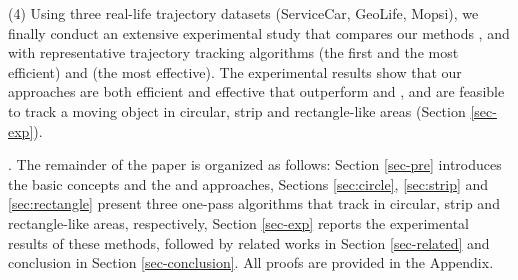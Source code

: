 \ni (4) Using three real-life trajectory datasets (ServiceCar, GeoLife, Mopsi), we finally conduct an extensive experimental study that compares our methods \citt, \sitt and \bitt with  representative trajectory tracking algorithms \ldrh (the first and the most efficient) and \grts (the most effective). The experimental results show that our approaches are both efficient and effective that outperform \ldrh and \grts, and are feasible to track a moving object in circular, strip and rectangle-like areas (Section \ref{sec-exp}).

.
The remainder of the paper is organized as follows:
Section \ref{sec-pre} introduces the basic concepts and the \ldr and \ldrh approaches,
Sections \ref{sec:circle}, \ref{sec:strip} and \ref{sec:rectangle} present three one-pass algorithms that track in circular, strip and rectangle-like areas, respectively,
Section \ref{sec-exp} reports the experimental results of these methods, followed by related works in Section \ref{sec-related} and conclusion in Section \ref{sec-conclusion}.
All proofs are provided in the Appendix.


